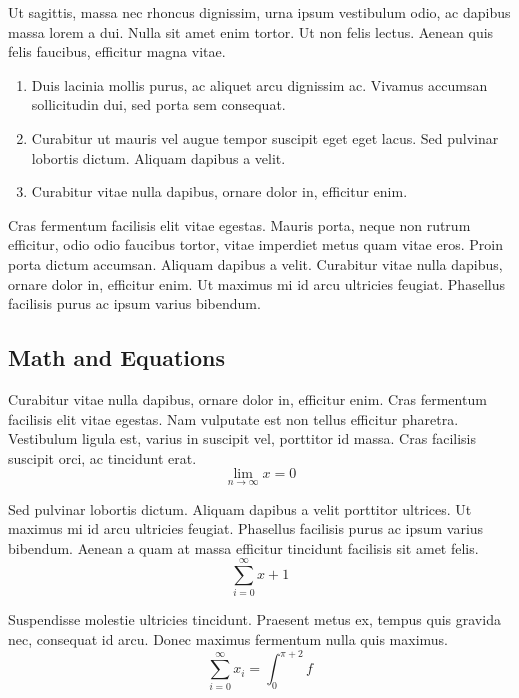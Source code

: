 \documentclass[sigconf, nonacm]{acmart}
\begin{document}
Ut sagittis, massa nec rhoncus dignissim, urna ipsum vestibulum odio, ac dapibus massa lorem a dui. Nulla sit amet enim tortor. Ut non felis lectus. Aenean quis felis faucibus, efficitur magna vitae. 

\begin{enumerate}
\item Duis lacinia mollis purus, ac aliquet arcu dignissim ac. Vivamus accumsan sollicitudin dui, sed porta sem consequat.
\item Curabitur ut mauris vel augue tempor suscipit eget eget lacus. Sed pulvinar lobortis dictum. Aliquam dapibus a velit.
\item Curabitur vitae nulla dapibus, ornare dolor in, efficitur enim.
\end{enumerate}

Cras fermentum facilisis elit vitae egestas. Mauris porta, neque non rutrum efficitur, odio odio faucibus tortor, vitae imperdiet metus quam vitae eros. Proin porta dictum accumsan. Aliquam dapibus a velit. Curabitur vitae nulla dapibus, ornare dolor in, efficitur enim. Ut maximus mi id arcu ultricies feugiat. Phasellus facilisis purus ac ipsum varius bibendum.

\subsection{Math and Equations}

Curabitur vitae nulla dapibus, ornare dolor in, efficitur enim. Cras fermentum facilisis elit vitae egestas. Nam vulputate est non tellus efficitur pharetra. Vestibulum ligula est, varius in suscipit vel, porttitor id massa. Cras facilisis suscipit orci, ac tincidunt erat.
\begin{equation}
  \lim_{n\rightarrow \infty}x=0
\end{equation}

Sed pulvinar lobortis dictum. Aliquam dapibus a velit porttitor ultrices. Ut maximus mi id arcu ultricies feugiat. Phasellus facilisis purus ac ipsum varius bibendum. Aenean a quam at massa efficitur tincidunt facilisis sit amet felis. 
\begin{displaymath}
  \sum_{i=0}^{\infty} x + 1
\end{displaymath}

Suspendisse molestie ultricies tincidunt. Praesent metus ex, tempus quis gravida nec, consequat id arcu. Donec maximus fermentum nulla quis maximus.
\begin{equation}
  \sum_{i=0}^{\infty}x_i=\int_{0}^{\pi+2} f
\end{equation}
\end{document}
